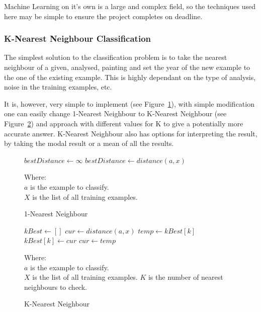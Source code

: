 \documentclass[11pt,fleqn,twoside]{article}
\begin{document}
Machine Learning on it's own is a large and complex field, so the techniques used here may be
simple to ensure the project completes on deadline.

\subsubsection{K-Nearest Neighbour Classification}
The simplest solution to the classification problem is to take the nearest neighbour of a given,
analysed, painting and set the year of the new example to the one of the existing example. This
is highly dependant on the type of analysis, noise in the training examples, etc.

It is, however, very simple to implement (see Figure~\ref{fig:1-nn}), with simple modification
one can easily change 1-Nearest Neighbour to K-Nearest Neighbour (see Figure~\ref{fig:k-nn}) and
approach with different values for K to give a potentially more accurate answer. K-Nearest 
Neighbour also has options for interpreting the result, by taking the modal result or a mean of all
the results.

\begin{figure}
\begin{algorithmic}
\State $bestDistance \gets \infty$
		\State $bestDistance \gets distance(a, x)$
	\EndIf
\EndFor
\end{algorithmic}

Where:\\
\(a\) is the example to classify.\\
\(X\) is the list of all training examples.
\caption{1-Nearest Neighbour}
\label{fig:1-nn}
\end{figure}

\begin{figure}
\begin{algorithmic}
\State $kBest \gets []$
	\State $cur \gets distance(a, x)$
			\State $temp \gets kBest[k]$
			\State $kBest[k] \gets cur$
			\State $cur \gets temp$
		\EndIf
	\EndFor
\EndFor
\end{algorithmic}
Where:\\
$a$ is the example to classify.\\
$X$ is the list of all training examples.
$K$ is the number of nearest neighbours to check.
\caption{K-Nearest Neighbour}
\label{fig:k-nn}
\end{figure}

\end{document}
